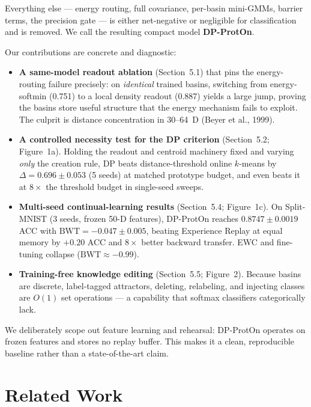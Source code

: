 \documentclass[11pt,a4paper]{article}
\begin{document}
Everything else — energy routing, full covariance, per-basin mini-GMMs, barrier terms, the precision gate — is either net-negative or negligible for classification and is removed. We call the resulting compact model \textbf{DP-ProtOn}.

Our contributions are concrete and diagnostic:

\begin{itemize}[leftmargin=*]
\item \textbf{A same-model readout ablation} (Section~5.1) that pins the energy-routing failure precisely: on \textit{identical} trained basins, switching from energy-softmin (0.751) to a local density readout (0.887) yields a large jump, proving the basins store useful structure that the energy mechanism fails to exploit. The culprit is distance concentration in 30–64~D (Beyer et al., 1999).
\item \textbf{A controlled necessity test for the DP criterion} (Section~5.2; Figure~1a). Holding the readout and centroid machinery fixed and varying \textit{only} the creation rule, DP beats distance-threshold online $k$-means by $\Delta=0.696\pm0.053$ (5 seeds) at matched prototype budget, and even beats it at $8\times$ the threshold budget in single-seed sweeps.
\item \textbf{Multi-seed continual-learning results} (Section~5.4; Figure~1c). On Split-MNIST (3 seeds, frozen 50-D features), DP-ProtOn reaches $0.8747\pm0.0019$ ACC with $\text{BWT}=-0.047\pm0.005$, beating Experience Replay at equal memory by $+0.20$ ACC and $8\times$ better backward transfer. EWC and fine-tuning collapse ($\text{BWT}\approx-0.99$).
\item \textbf{Training-free knowledge editing} (Section~5.5; Figure~2). Because basins are discrete, label-tagged attractors, deleting, relabeling, and injecting classes are $O(1)$ set operations — a capability that softmax classifiers categorically lack.
\end{itemize}

We deliberately scope out feature learning and rehearsal: DP-ProtOn operates on frozen features and stores no replay buffer. This makes it a clean, reproducible baseline rather than a state-of-the-art claim.

\section{Related Work}
\end{document}
